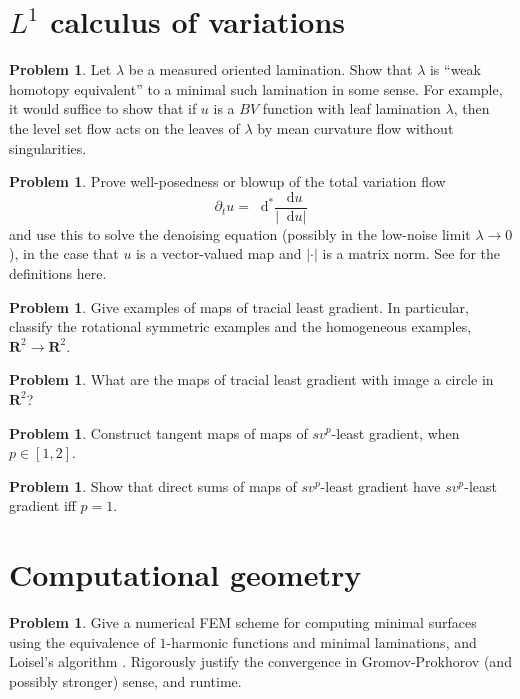 \documentclass[reqno,11pt]{amsart}
\newcommand{\RR}{\mathbf{R}}
\newcommand*\dif{\mathop{}\!\mathrm{d}}
\theoremstyle{definition}
\newtheorem{problem}[theorem]{Problem}
\numberwithin{equation}{section}
\begin{document}
\section{\texorpdfstring{$L^1$}{L-1} calculus of variations}
\begin{problem}
Let $\lambda$ be a measured oriented lamination.
Show that $\lambda$ is ``weak homotopy equivalent'' to a minimal such lamination in some sense.
For example, it would suffice to show that if $u$ is a $BV$ function with leaf lamination $\lambda$, then the level set flow acts on the leaves of $\lambda$ by mean curvature flow without singularities.
\end{problem}

\begin{problem}
Prove well-posedness or blowup of the total variation flow 
$$\partial_t u = \dif^* \frac{\dif u}{|\dif u|}$$
and use this to solve the denoising equation (possibly in the low-noise limit $\lambda \to 0$), in the case that $u$ is a vector-valued map and $|\cdot|$ is a matrix norm.
See \cite{Novaga04} for the definitions here.
\end{problem}

\begin{problem}
Give examples of maps of tracial least gradient.
In particular, classify the rotational symmetric examples and the homogeneous examples, $\RR^2 \to \RR^2$.
\end{problem}

\begin{problem}
What are the maps of tracial least gradient with image a circle in $\RR^2$?
\end{problem}

\begin{problem}
Construct tangent maps of maps of $sv^p$-least gradient, when $p \in [1, 2]$.
\end{problem}

\begin{problem}
Show that direct sums of maps of $sv^p$-least gradient have $sv^p$-least gradient iff $p = 1$.
\end{problem}

\section{Computational geometry}
\begin{problem}
Give a numerical FEM scheme for computing minimal surfaces using the equivalence of $1$-harmonic functions and minimal laminations, and Loisel's algorithm \cite{Loisel20}.
Rigorously justify the convergence in Gromov-Prokhorov (and possibly stronger) sense, and runtime.
\end{problem}
\end{document}
